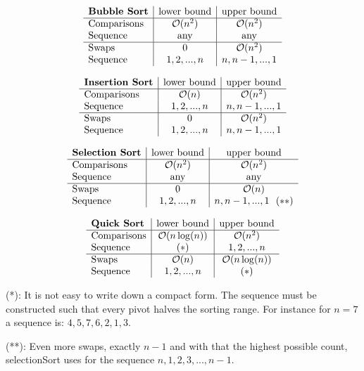 \begin{sectionbox}
  
%

$$
  \begin{array}{l | c | c }
    \textbf{Bubble Sort} & \text{lower bound} & \text{upper bound}\\ \hline
    \text{Comparisons} & \mathcal{O}(n^2) & \mathcal{O}(n^2)\\
    \text{Sequence} & \text{any} & \text{any} \\ \hline
    \text{Swaps} & 0 & \mathcal{O}(n^2)\\
    \text{Sequence} & 1,2,...,n & n,n-1,...,1  \\
  \end{array}
$$


$$
  \begin{array}{l | c | c }
    \textbf{Insertion Sort} & \text{lower bound} & \text{upper bound}\\ \hline
    \text{Comparisons} & \mathcal{O}(n) & \mathcal{O}(n^2)\\
    \text{Sequence} & 1,2,...,n & n,n-1,...,1 \\ \hline
    \text{Swaps} & 0 & \mathcal{O}(n^2)\\
    \text{Sequence} & 1,2,...,n & n,n-1,...,1  \\
  \end{array}
$$
\end{sectionbox}
\vspace{-4pt}
\begin{sectionbox}

$$
  \begin{array}{l | c | c }
    \textbf{Selection Sort} & \text{lower bound} & \text{upper bound}\\ \hline
    \text{Comparisons} & \mathcal{O}(n^2) & \mathcal{O}(n^2)\\
    \text{Sequence} & \text{any} & \text{any} \\ \hline
    \text{Swaps} & 0 & \mathcal{O}(n)\\
    \text{Sequence} & 1,2,...,n & n,n-1,...,1 ~~(**) \\
  \end{array}
$$


$$
  \begin{array}{l | c | c }
    \textbf{Quick Sort} & \text{lower bound} & \text{upper bound}\\ \hline
    \text{Comparisons} & \mathcal{O}(n\log(n))& \mathcal{O}(n^2) \\
    \text{Sequence} & (*) & 1,2,...,n \\ \hline
    \text{Swaps} & \mathcal{O}(n) & \mathcal{O}(n \log(n))  \\
    \text{Sequence} & 1,2,...,n & (*) \\
  \end{array}
$$


(*): It is not easy to write down a compact form. The sequence must be constructed such that every pivot halves the sorting range. For instance for $n=7$ a sequence is: $4,5,7,6,2,1,3$.

(**): Even more swaps, exactly $n-1$ and with that the highest possible count, selectionSort uses for the sequence $n, 1, 2, 3, ..., n-1$.
\end{sectionbox}